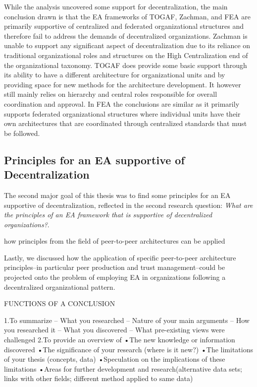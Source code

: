 While the analysis uncovered some support for decentralization, the main conclusion drawn is that the EA frameworks of TOGAF, Zachman, and FEA are primarily supportive of centralized and federated organizational structures and therefore fail to address the demands of decentralized organizations. Zachman is unable to support any significant aspect of decentralization due to its reliance on traditional organizational roles and structures on the High Centralization end of the organizational taxonomy. TOGAF does provide some basic support through its ability to have a different architecture for organizational units and by providing space for new methods for the architecture development. It however still mainly relies on hierarchy and central roles responsible for overall coordination and approval. In FEA the conclusions are similar as it primarily supports federated organizational structures where individual units have their own architectures that are coordinated through centralized standards that must be followed.


\subsection{Principles for an EA supportive of Decentralization}

The second major goal of this thesis was to find some principles for an EA supportive of decentralization, reflected in the second research question: \textit{What are the principles of an EA framework that is supportive of decentralized organizations?}. 

how principles from the field of peer-to-peer architectures can be applied 

Lastly, we discussed how the application of specific
peer-to-peer architecture principles–in particular peer
production and trust management–could be projected onto
the problem of employing EA in organizations following a
decentralized organizational pattern.

FUNCTIONS OF A CONCLUSION

1.To summarize
 – What you researched 
 – Nature of your main arguments 
 – How you researched it 
 – What you discovered 
 – What pre-existing views were challenged
2.To provide an overview of 
•The new knowledge or information discovered
•The significance of your research (where is it new?)
•The limitations of your thesis (concepts, data)
•Speculation on the implications of these limitations
•Areas for further development and research(alternative data sets; links with other fields; different method applied to same data)


